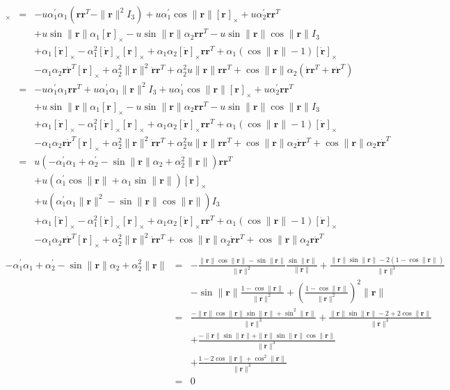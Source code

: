 \documentclass {article}
\newcommand\rot{\mathbf{r}}
\newcommand\rcross[1]{[\rot_{#1}]_{\times}}
\newcommand\omegacross{[\omega]_{\times}}
\newcommand\rdotcross{\left[\dot{\rot}\right]_{\times}}
\newcommand\normr{\|\rot\|}
\newcommand\alphap{\alpha^{\prime}}
\begin{document}
\begin{eqnarray*}
\omegacross &=&
- u \alphap_1\alpha_1 (\rot\rot^T-\normr^2 I_3) + u \alphap_1 \cos\normr \rcross{} + u\alphap_2 \rot\rot^T\\
&& + u \sin\normr\alpha_1 \rcross{} - u \sin\normr\alpha_2 \rot\rot^T - u \sin\normr\cos\normr I_3\\
&& +\alpha_1 \rdotcross - \alpha_1^2 \rdotcross\rcross{} + \alpha_1 \alpha_2 \rdotcross\rot\rot^T + \alpha_1(\cos\normr-1)\rdotcross\\
&&- \alpha_1 \alpha_2 \rot\dot{\rot}^T\rcross{} +  \alpha_2^2\normr^2\dot{\rot}\rot^T + \alpha_2^2u\normr\rot\rot^T + \cos\normr\alpha_2 (\dot{\rot}\rot^T + \rot\dot{\rot}^T)\\
&=& - u \alphap_1\alpha_1 \rot\rot^T + u \alphap_1\alpha_1\normr^2 I_3 + u \alphap_1 \cos\normr \rcross{} + u\alphap_2 \rot\rot^T\\
&& + u \sin\normr\alpha_1 \rcross{} - u \sin\normr\alpha_2 \rot\rot^T - u \sin\normr\cos\normr I_3\\
&& +\alpha_1 \rdotcross - \alpha_1^2 \rdotcross\rcross{} + \alpha_1 \alpha_2 \rdotcross\rot\rot^T + \alpha_1(\cos\normr-1)\rdotcross\\
&&- \alpha_1 \alpha_2 \rot\dot{\rot}^T\rcross{} +  \alpha_2^2\normr^2\dot{\rot}\rot^T + \alpha_2^2u\normr\rot\rot^T + \cos\normr\alpha_2\dot{\rot}\rot^T + \cos\normr\alpha_2\rot\dot{\rot}^T\\
&=& u \left(-\alphap_1\alpha_1 + \alphap_2 - \sin\normr\alpha_2 + \alpha_2^2\normr\right)\rot\rot^T \\
&&+ u\left(\alphap_1 \cos\normr + \alpha_1\sin\normr\right) \rcross{}\\
&&+ u\left(\alphap_1\alpha_1\normr^2 - \sin\normr\cos\normr\right) I_3\\
&& +\alpha_1 \rdotcross - \alpha_1^2 \rdotcross\rcross{} + \alpha_1 \alpha_2 \rdotcross\rot\rot^T + \alpha_1(\cos\normr-1)\rdotcross\\
&&- \alpha_1 \alpha_2 \rot\dot{\rot}^T\rcross{} +  \alpha_2^2\normr^2\dot{\rot}\rot^T + \cos\normr\alpha_2\dot{\rot}\rot^T + \cos\normr\alpha_2\rot\dot{\rot}^T\\
\end{eqnarray*}
\begin{eqnarray*}
-\alphap_1\alpha_1 + \alphap_2 - \sin\normr\alpha_2 + \alpha_2^2\normr
&=&
-\frac{\normr \cos \normr - \sin \normr}{\normr^2}\frac{\sin \normr}{\normr} + \frac{\normr \sin \normr -2(1-\cos \normr)}{\normr^3}\\
&& - \sin\normr\frac{1 - \cos \normr}{\normr^2} + \left(\frac{1 - \cos \normr}{\normr^2}\right)^2\normr\\
&=&\frac{-\normr \cos \normr \sin \normr + \sin^2 \normr}{\normr^3}+\frac{\normr \sin \normr -2+2\cos \normr}{\normr^3}\\
&& +\frac{-\normr\sin\normr + \normr\sin\normr\cos \normr}{\normr^3}\\
&&+\frac{1 - 2\cos \normr + \cos^2 \normr}{\normr^3}\\
&=& 0
\end{eqnarray*}
\end{document}
